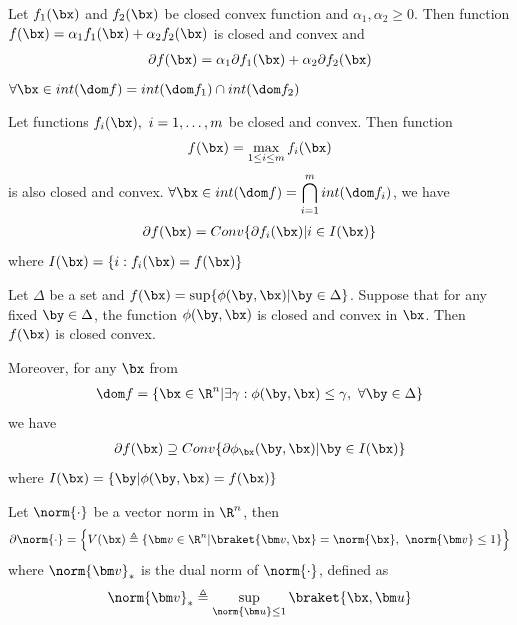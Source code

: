 \begin{lemma}
    Let $f_1(\bx)$ and $f_2(\bx)$ be closed convex function and $\alpha_1, \alpha_2\ge 0$. Then function $f(\bx)=\alpha_1f_1(\bx)+\alpha_2f_2(\bx)$ is closed and convex and
    \begin{align*}
        \partial f(\bx)=\alpha_1\partial f_1(\bx)+\alpha_2\partial f_2(\bx)
    \end{align*}
    $\forall \bx \in int(\dom f)=int(\dom f_1)\cap int(\dom f_2)$
\end{lemma}

\begin{lemma}
    Let functions $f_i(\bx),\ i=1,\dots,m$ be closed and convex. Then function
    \begin{align*}
        f(\bx)=\max_{1\le i\le m}f_i(\bx)
    \end{align*}
    is also closed and convex. $\displaystyle \forall \bx \in int(\dom f)=\bigcap_{i=1}^m int(\dom f_i)$, we have
    \begin{align*}
        \partial f(\bx)=Conv\{ \partial f_i(\bx)|i\in I(\bx) \}
    \end{align*}
    where $I(\bx)=\{ i: f_i(\bx)=f(\bx) \}$
\end{lemma}

\begin{lemma}
    Let $\Delta$ be a set and $f(\bx)=\sup\{ \phi(\by,\bx)|\by\in\Delta \}$. Suppose that for any fixed $\by\in\Delta$, the function $\phi(\by,\bx)$ is closed and convex in $\bx$. Then $f(\bx)$ is closed convex. 

    Moreover, for any $\bx$ from 
    \begin{align*}
        \dom f=\{ \bx\in\R^n|\exists \gamma:\phi(\by, \bx)\le \gamma,\ \forall \by \in \Delta \}
    \end{align*}
    we have
    \begin{align*}
        \partial f(\bx)\supseteq Conv\{ \partial \phi_{\bx}(\by,\bx)|\by\in I(\bx) \}
    \end{align*}
    where $I(\bx)=\{ \by|\phi(\by,\bx)=f(\bx) \}$
\end{lemma}

\begin{theorem}
    Let $\norm{\cdot}$ be a vector norm in $\R^n$, then 
    \begin{align*}
        \partial \norm{\cdot}=\left\{ V(\bx) \triangleq \left\{ \bm v\in\R^n|\braket{\bm v,\bx}=\norm{\bx},\ \norm{\bm v}\le 1 \right\} \right\}
    \end{align*}
    where $\norm{\bm v}_*$ is the dual norm of $\norm{\cdot}$, defined as
    \begin{align*}
        \norm{\bm v}_* \triangleq \sup_{\norm{\bm u}\le 1}\braket{\bx, \bm u}
    \end{align*}
\end{theorem}


